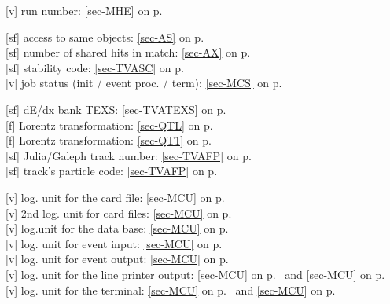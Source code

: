  [v] run number: \ref{sec-MHE} on p.~\pageref{sec-MHE}
 
 [sf] access to same objects: \ref{sec-AS} on p.~\pageref{sec-AS}\\
 [sf] number of shared hits in match: \ref{sec-AX} on p.~\pageref{sec-AX}\\
 [sf] stability code: \ref{sec-TVASC} on p.~\pageref{sec-TVASC}\\
 [v] job status (init / event proc. / term):
 \ref{sec-MCS} on p.~\pageref{sec-MCS}
 
 [sf] dE/dx bank TEXS: \ref{sec-TVATEXS} on p.~\pageref{sec-TVATEXS}\\
 [f] Lorentz transformation: \ref{sec-QTL} on p.~\pageref{sec-QTL}\\
 [f] Lorentz transformation: \ref{sec-QT1} on p.~\pageref{sec-QT1}\\
 [sf] Julia/Galeph track number: \ref{sec-TVAFP} on p.~\pageref{sec-TVAFP}\\
 [sf] track's particle code: \ref{sec-TVAFP} on p.~\pageref{sec-TVAFP}
 
 [v] log. unit for the card file: \ref{sec-MCU} on p.~\pageref{sec-MCU}\\
 [v] 2nd log. unit for card files: \ref{sec-MCU} on p.~\pageref{sec-MCU}\\
 [v] log.unit for the data base: \ref{sec-MCU} on p.~\pageref{sec-MCU}\\
 [v] log. unit for event input: \ref{sec-MCU} on p.~\pageref{sec-MCU}\\
 [v] log. unit for event output: \ref{sec-MCU} on p.~\pageref{sec-MCU}\\
 [v] log. unit for the line printer output:
 \ref{sec-MCU} on p.~\pageref{sec-MCU} and \ref{sec-MCU} on p.~\pageref{sec-MCU}\\
 [v] log. unit for the terminal:
 \ref{sec-MCU} on p.~\pageref{sec-MCU} and \ref{sec-MCU} on p.~\pageref{sec-MCU}
 

